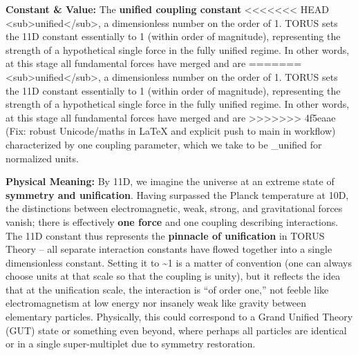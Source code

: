 \documentclass[]{article}
\begin{document}
\textbf{Constant \& Value:} The \textbf{unified coupling constant}
<<<<<<< HEAD
\alpha\textless sub\textgreater unified\textless/sub\textgreater, a
dimensionless number on the order of 1\hspace{0pt}. TORUS sets the 11D
constant essentially to 1 (within order of magnitude), representing the
strength of a hypothetical single force in the fully unified regime. In
other words, at this stage all fundamental forces have merged and are
=======
\alpha\textless{}sub\textgreater{}unified\textless{}/sub\textgreater{}, a
dimensionless number on the order of 1​. TORUS sets the 11D constant
essentially to 1 (within order of magnitude), representing the strength
of a hypothetical single force in the fully unified regime. In other
words, at this stage all fundamental forces have merged and are
>>>>>>> 4f5eaae (Fix: robust Unicode/maths in LaTeX and explicit push to main in workflow)
characterized by one coupling parameter, which we take to be \alpha\_unified
 for normalized units.

\textbf{Physical Meaning:} By 11D, we imagine the universe at an extreme
state of \textbf{symmetry and unification}. Having surpassed the Planck
temperature at 10D, the distinctions between electromagnetic, weak,
strong, and gravitational forces vanish; there is effectively
\textbf{one force} and one coupling describing interactions​. The 11D
constant thus represents the \textbf{pinnacle of unification} in TORUS
Theory -- all separate interaction constants have flowed together into a
single dimensionless constant. Setting it to \textasciitilde{}1 is a
matter of convention (one can always choose units at that scale so that
the coupling is unity), but it reflects the idea that at the unification
scale, the interaction is ``of order one,'' not feeble like
electromagnetism at low energy nor insanely weak like gravity between
elementary particles. Physically, this could correspond to a Grand
Unified Theory (GUT) state or something even beyond, where perhaps all
particles are identical or in a single super-multiplet due to symmetry
restoration​.
\end{document}
